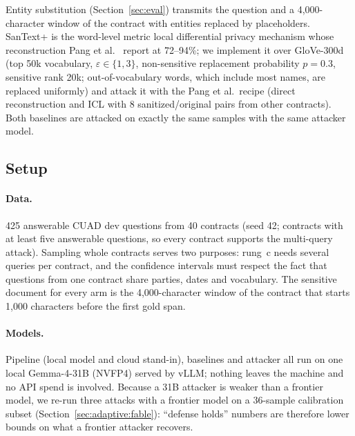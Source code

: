 Entity substitution (Section~\ref{sec:eval}) transmits the question and a 4{,}000-character window of the contract with entities replaced by placeholders. SanText+ \cite{yue2021santext} is the word-level metric local differential privacy mechanism whose reconstruction Pang et al.\ \cite{pang2024reconstruction} report at 72--94\%; we implement it over GloVe-300d (top 50k vocabulary, $\varepsilon\in\{1,3\}$, non-sensitive replacement probability $p{=}0.3$, sensitive rank 20k; out-of-vocabulary words, which include most names, are replaced uniformly) and attack it with the Pang et al.\ recipe (direct reconstruction and ICL with 8 sanitized/original pairs from other contracts). Both baselines are attacked on exactly the same samples with the same attacker model.

\subsection{Setup}
\label{sec:adaptive:setup}

\paragraph{Data.} 425 answerable CUAD dev questions from 40 contracts (seed 42; contracts with at least five answerable questions, so every contract supports the multi-query attack). Sampling whole contracts serves two purposes: rung~c needs several queries per contract, and the confidence intervals must respect the fact that questions from one contract share parties, dates and vocabulary. The sensitive document for every arm is the 4{,}000-character window of the contract that starts 1{,}000 characters before the first gold span.

\paragraph{Models.} Pipeline (local model and cloud stand-in), baselines and attacker all run on one local Gemma-4-31B (NVFP4) served by vLLM; nothing leaves the machine and no API spend is involved. Because a 31B attacker is weaker than a frontier model, we re-run three attacks with a frontier model on a 36-sample calibration subset (Section~\ref{sec:adaptive:fable}): ``defense holds'' numbers are therefore lower bounds on what a frontier attacker recovers.

